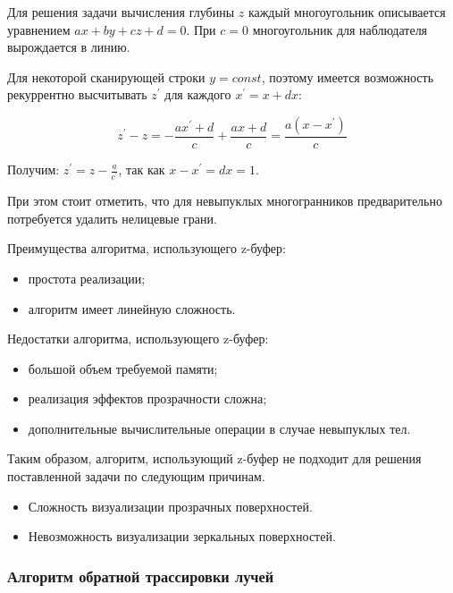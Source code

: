 Для решения задачи вычисления глубины $z$ каждый многоугольник описывается уравнением $ax + by + cz + d = 0$. При $c = 0$ многоугольник для наблюдателя вырождается в линию. 

Для некоторой сканирующей строки $y = const$, поэтому имеется возможность рекуррентно высчитывать $z^\prime$ для каждого $x^\prime = x + dx$:

\begin{equation}
	z^\prime - z = -\frac{ax^\prime + d}{c} +\frac{ax + d}{c} = \frac{a(x - x^\prime)}{c}
\end{equation}

Получим: $z^\prime = z - \frac{a}{c^\prime}$, так как $x - x^\prime = dx = 1$.

При этом стоит отметить, что для невыпуклых многогранников предварительно потребуется удалить нелицевые грани.

Преимущества алгоритма, использующего z-буфер:
\begin{itemize}
	\item простота реализации;
	\item алгоритм имеет линейную сложность.
\end{itemize}

Недостатки алгоритма, использующего z-буфер:
\begin{itemize}
	\item большой объем требуемой памяти;
	\item реализация эффектов прозрачности сложна;
	\item дополнительные вычислительные операции в случае невыпуклых тел.
\end{itemize}

Таким образом, алгоритм, использующий z-буфер не подходит для решения поставленной задачи по следующим причинам.

\begin{itemize}
	\item Сложность визуализации прозрачных поверхностей.
	\item Невозможность визуализации зеркальных поверхностей.
\end{itemize}

\subsubsection{Алгоритм обратной трассировки лучей}

